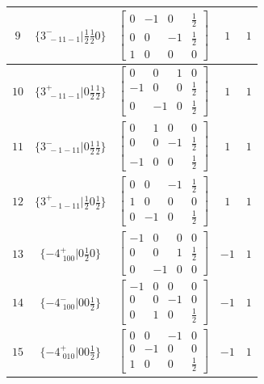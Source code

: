 \documentclass[fleqn,8pt]{jsarticle}
\begin{document}
\begin{longtable}{ccccc}
$ 9 $ & $ \{3^{-}_{\,\,-11-1}|\frac{1}{2} \frac{1}{2} 0\} $ & $ \begin{bmatrix} 0 & -1 & 0 & \frac{1}{2} \\ 0 & 0 & -1 & \frac{1}{2} \\ 1 & 0 & 0 & 0 \end{bmatrix} $ & $ 1 $ & $ 1 $ \\ \hline
$ 10 $ & $ \{3^{+}_{\,\,-11-1}|0 \frac{1}{2} \frac{1}{2}\} $ & $ \begin{bmatrix} 0 & 0 & 1 & 0 \\ -1 & 0 & 0 & \frac{1}{2} \\ 0 & -1 & 0 & \frac{1}{2} \end{bmatrix} $ & $ 1 $ & $ 1 $ \\ \hline
$ 11 $ & $ \{3^{-}_{\,\,-1-11}|0 \frac{1}{2} \frac{1}{2}\} $ & $ \begin{bmatrix} 0 & 1 & 0 & 0 \\ 0 & 0 & -1 & \frac{1}{2} \\ -1 & 0 & 0 & \frac{1}{2} \end{bmatrix} $ & $ 1 $ & $ 1 $ \\ \hline
$ 12 $ & $ \{3^{+}_{\,\,-1-11}|\frac{1}{2} 0 \frac{1}{2}\} $ & $ \begin{bmatrix} 0 & 0 & -1 & \frac{1}{2} \\ 1 & 0 & 0 & 0 \\ 0 & -1 & 0 & \frac{1}{2} \end{bmatrix} $ & $ 1 $ & $ 1 $ \\ \hline
$ 13 $ & $ \{-4^{+}_{\,\,100}|0 \frac{1}{2} 0\} $ & $ \begin{bmatrix} -1 & 0 & 0 & 0 \\ 0 & 0 & 1 & \frac{1}{2} \\ 0 & -1 & 0 & 0 \end{bmatrix} $ & $ -1 $ & $ 1 $ \\ \hline
$ 14 $ & $ \{-4^{-}_{\,\,100}|0 0 \frac{1}{2}\} $ & $ \begin{bmatrix} -1 & 0 & 0 & 0 \\ 0 & 0 & -1 & 0 \\ 0 & 1 & 0 & \frac{1}{2} \end{bmatrix} $ & $ -1 $ & $ 1 $ \\ \hline
$ 15 $ & $ \{-4^{+}_{\,\,010}|0 0 \frac{1}{2}\} $ & $ \begin{bmatrix} 0 & 0 & -1 & 0 \\ 0 & -1 & 0 & 0 \\ 1 & 0 & 0 & \frac{1}{2} \end{bmatrix} $ & $ -1 $ & $ 1 $ \\ \hline

\end{longtable}
\end{document}
